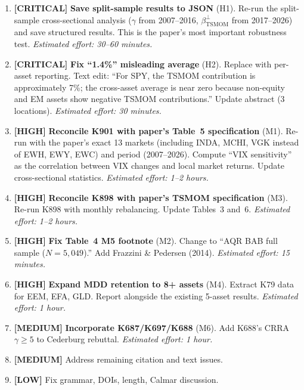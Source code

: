 \documentclass[12pt,a4paper]{article}
\begin{document}
\begin{enumerate}

\item \textbf{[CRITICAL]} \textbf{Save split-sample results to JSON} (H1). Re-run the split-sample cross-sectional analysis ($\gamma$ from 2007--2016, $\beta_{\text{TSMOM}}^{\perp}$ from 2017--2026) and save structured results. This is the paper's most important robustness test. \textit{Estimated effort: 30--60 minutes.}

\item \textbf{[CRITICAL]} \textbf{Fix ``1.4\%'' misleading average} (H2). Replace with per-asset reporting. Text edit: ``For SPY, the TSMOM contribution is approximately 7\%; the cross-asset average is near zero because non-equity and EM assets show negative TSMOM contributions.'' Update abstract (3 locations). \textit{Estimated effort: 30 minutes.}

\item \textbf{[HIGH]} \textbf{Reconcile K901 with paper's Table~5 specification} (M1). Re-run with the paper's exact 13 markets (including INDA, MCHI, VGK instead of EWH, EWY, EWC) and period (2007--2026). Compute ``VIX sensitivity'' as the correlation between VIX changes and local market returns. Update cross-sectional statistics. \textit{Estimated effort: 1--2 hours.}

\item \textbf{[HIGH]} \textbf{Reconcile K898 with paper's TSMOM specification} (M3). Re-run K898 with monthly rebalancing. Update Tables~3 and~6. \textit{Estimated effort: 1--2 hours.}

\item \textbf{[HIGH]} \textbf{Fix Table~4 M5 footnote} (M2). Change to ``AQR BAB full sample ($N = 5{,}049$).'' Add Frazzini \& Pedersen (2014). \textit{Estimated effort: 15 minutes.}

\item \textbf{[HIGH]} \textbf{Expand MDD retention to 8+ assets} (M4). Extract K79 data for EEM, EFA, GLD. Report alongside the existing 5-asset results. \textit{Estimated effort: 1 hour.}

\item \textbf{[MEDIUM]} \textbf{Incorporate K687/K697/K688} (M6). Add K688's CRRA $\gamma \geq 5$ to Cederburg rebuttal. \textit{Estimated effort: 1 hour.}

\item \textbf{[MEDIUM]} Address remaining citation and text issues.

\item \textbf{[LOW]} Fix grammar, DOIs, length, Calmar discussion.

\end{enumerate}
\end{document}
